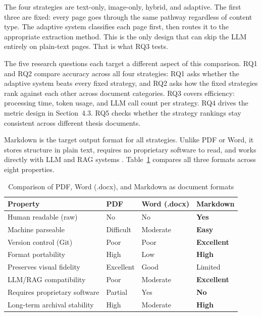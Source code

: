 \documentclass[12pt]{article}
\begin{document}
The four strategies are text-only, image-only, hybrid, and adaptive. The first
three are fixed: every page goes through the same pathway regardless of content
type. The adaptive system classifies each page first, then routes it to the
appropriate extraction method. This is the only design that can skip the LLM
entirely on plain-text pages. That is what RQ3 tests.

The five research questions each target a different aspect of this comparison.
RQ1 and RQ2 compare accuracy across all four strategies: RQ1 asks whether the
adaptive system beats every fixed strategy, and RQ2 asks how the fixed
strategies rank against each other across document categories. RQ3 covers
efficiency: processing time, token usage, and LLM call count per strategy. RQ4
drives the metric design in Section~4.3. RQ5 checks whether the strategy
rankings stay consistent across different thesis documents.

Markdown is the target output format for all strategies. Unlike PDF or Word, it
stores structure in plain text, requires no proprietary software to read, and
works directly with LLM and RAG systems \cite{cone2019, khan2024}.
Table~\ref{tab:format_comparison} compares all three formats across eight
properties.

\begin{table}[h!]
\centering
\caption{Comparison of PDF, Word (.docx), and Markdown as document formats}
\label{tab:format_comparison}
\renewcommand{\arraystretch}{1.4}
\begin{tabularx}{\textwidth}{lXXX}
\toprule
\textbf{Property} & \textbf{PDF} & \textbf{Word (.docx)} & \textbf{Markdown} \\
\midrule
Human readable (raw) & No & No & \textbf{Yes} \\
Machine parseable & Difficult & Moderate & \textbf{Easy} \\
Version control (Git) & Poor & Poor & \textbf{Excellent} \\
Format portability & High & Low & \textbf{High} \\
Preserves visual fidelity & Excellent & Good & Limited \\
LLM/RAG compatibility & Poor & Moderate & \textbf{Excellent} \\
Requires proprietary software & Partial & Yes & \textbf{No} \\
Long-term archival stability & High & Moderate & \textbf{High} \\
\bottomrule
\end{tabularx}
\end{table}
\end{document}
